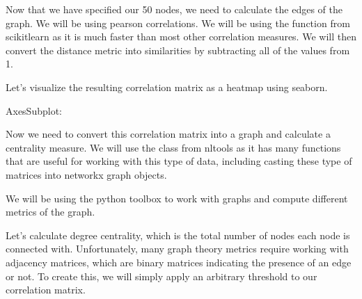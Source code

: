 \documentclass[letterpaper,10pt,english]{sphinxmanual}
\begin{document}
\noindent{}

Now that we have specified our 50 nodes, we need to calculate the edges of the graph. We will be using pearson correlations. We will be using the  function from scikit\sphinxhyphen{}learn as it is much faster than most other correlation measures. We will then convert the distance metric into similarities by subtracting all of the values from 1.

Let’s visualize the resulting correlation matrix as a heatmap using seaborn.

\begin{sphinxVerbatim}[commandchars=\\\{\}]
     

    
\end{sphinxVerbatim}

\begin{sphinxVerbatim}[commandchars=\\\{\}]
\PYGZlt{}AxesSubplot:\PYGZgt{}
\end{sphinxVerbatim}

\noindent{}

Now we need to convert this correlation matrix into a graph and calculate a centrality measure. We will use the  class from nltools as it has many functions that are useful for working with this type of data, including casting these type of matrices into networkx graph objects.

We will be using the  python toolbox to work with graphs and compute different metrics of the graph.

Let’s calculate degree centrality, which is the total number of nodes each node is connected with. Unfortunately, many graph theory metrics require working with adjacency matrices, which are binary matrices indicating the presence of an edge or not. To create this, we will simply apply an arbitrary threshold to our correlation matrix.
\end{document}

